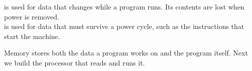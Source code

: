 \documentclass[mathserif, handout]{beamer}
\begin{document}
\begin{frame}
   is used for data that changes while a program runs. Its contents are lost when power is removed.\\[3mm]
   is used for data that must survive a power cycle, such as the instructions that start the machine.
\end{frame}

\begin{frame}
  \begin{center}
    Memory stores both the data a program works on and the program itself. Next we build the processor that reads and runs it.
  \end{center}
\end{frame}
\end{document}

